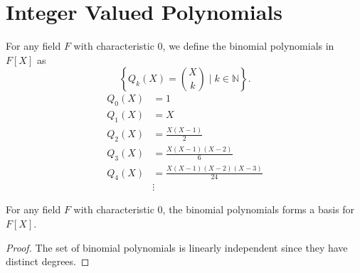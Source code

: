 \chapter{Integer Valued Polynomials}
\label{sec:integer_valued_polynomial}

\begin{definition}
    \label{def:binomial_polynomial}
    \leanok
    For any field $F$ with characteristic $0$, we define the binomial polynomials in $F[X]$ as
    \[
      \left\{ Q_k(X) = {X \choose k} \mid k \in \mathbb{N} \right\}.
    \]
    \begin{equation}
        \begin{aligned}
            Q_0(X) &= 1 \\
            Q_1(X) &= X \\
            Q_2(X) &= \frac{X(X-1)}{2} \\
            Q_3(X) &= \frac{X(X-1)(X-2)}{6} \\
            Q_4(X) &= \frac{X(X-1)(X-2)(X-3)}{24} \\
            &\vdots
        \end{aligned}
    \end{equation}
\end{definition}

\begin{lemma}
    For any field $F$ with characteristic $0$, the binomial polynomials forms a basis for $F[X]$.
    \leanok
\end{lemma}
\begin{proof}
    The set of binomial polynomials is linearly independent since they have distinct degrees.
\end{proof}

